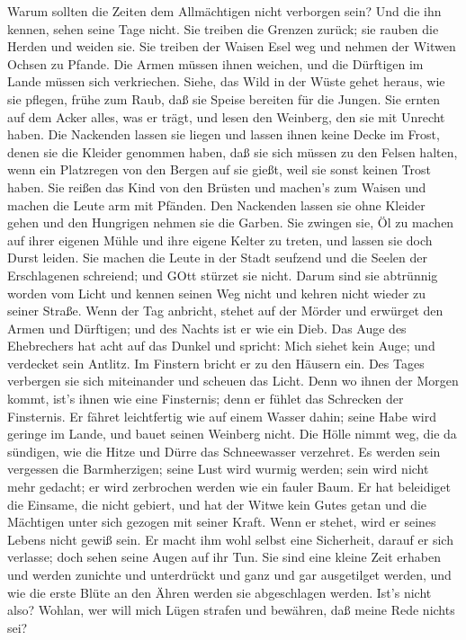  Warum sollten die Zeiten dem Allmächtigen nicht verborgen
sein? Und die ihn kennen, sehen seine Tage nicht.  Sie
treiben die Grenzen zurück; sie rauben die Herden und weiden sie.
 Sie treiben der Waisen Esel weg und nehmen der Witwen
Ochsen zu Pfande.  Die Armen müssen ihnen weichen, und die
Dürftigen im Lande müssen sich verkriechen.  Siehe, das Wild
in der Wüste gehet heraus, wie sie pflegen, frühe zum Raub, daß sie
Speise bereiten für die Jungen.  Sie ernten auf dem Acker
alles, was er trägt, und lesen den Weinberg, den sie mit Unrecht haben.
 Die Nackenden lassen sie liegen und lassen ihnen keine
Decke im Frost, denen sie die Kleider genommen haben,  daß
sie sich müssen zu den Felsen halten, wenn ein Platzregen von den Bergen
auf sie gießt, weil sie sonst keinen Trost haben.  Sie
reißen das Kind von den Brüsten und machen's zum Waisen und machen die
Leute arm mit Pfänden.  Den Nackenden lassen sie ohne
Kleider gehen und den Hungrigen nehmen sie die Garben.  Sie
zwingen sie, Öl zu machen auf ihrer eigenen Mühle und ihre eigene Kelter
zu treten, und lassen sie doch Durst leiden.  Sie machen
die Leute in der Stadt seufzend und die Seelen der Erschlagenen
schreiend; und GOtt stürzet sie nicht.  Darum sind sie
abtrünnig worden vom Licht und kennen seinen Weg nicht und kehren nicht
wieder zu seiner Straße.  Wenn der Tag anbricht, stehet auf
der Mörder und erwürget den Armen und Dürftigen; und des Nachts ist er
wie ein Dieb.  Das Auge des Ehebrechers hat acht auf das
Dunkel und spricht: Mich siehet kein Auge; und verdecket sein Antlitz.
 Im Finstern bricht er zu den Häusern ein. Des Tages
verbergen sie sich miteinander und scheuen das Licht.  Denn
wo ihnen der Morgen kommt, ist's ihnen wie eine Finsternis; denn er
fühlet das Schrecken der Finsternis.  Er fähret
leichtfertig wie auf einem Wasser dahin; seine Habe wird geringe im
Lande, und bauet seinen Weinberg nicht.  Die Hölle nimmt
weg, die da sündigen, wie die Hitze und Dürre das Schneewasser
verzehret.  Es werden sein vergessen die Barmherzigen;
seine Lust wird wurmig werden; sein wird nicht mehr gedacht; er wird
zerbrochen werden wie ein fauler Baum.  Er hat beleidiget
die Einsame, die nicht gebiert, und hat der Witwe kein Gutes getan
 und die Mächtigen unter sich gezogen mit seiner Kraft.
Wenn er stehet, wird er seines Lebens nicht gewiß sein.  Er
macht ihm wohl selbst eine Sicherheit, darauf er sich verlasse; doch
sehen seine Augen auf ihr Tun.  Sie sind eine kleine Zeit
erhaben und werden zunichte und unterdrückt und ganz und gar ausgetilget
werden, und wie die erste Blüte an den Ähren werden sie abgeschlagen
werden.  Ist's nicht also? Wohlan, wer will mich Lügen
strafen und bewähren, daß meine Rede nichts sei?


